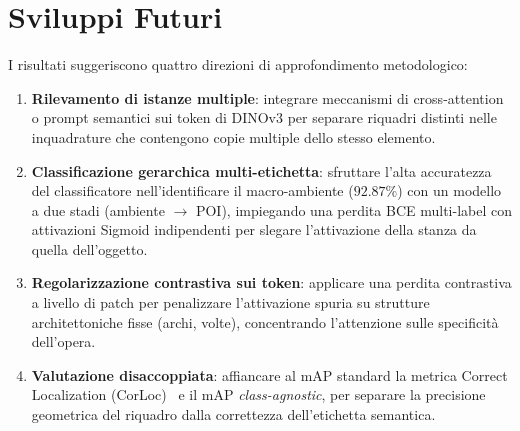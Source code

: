 \section{Sviluppi Futuri}
\label{sec:conc_sviluppi}
I risultati suggeriscono quattro direzioni di approfondimento metodologico:
\begin{enumerate}\setlength{\itemsep}{1pt}\setlength{\parskip}{0pt}
    \item \textbf{Rilevamento di istanze multiple}: integrare meccanismi di cross-attention o prompt semantici sui token di DINOv3 per separare riquadri distinti nelle inquadrature che contengono copie multiple dello stesso elemento.
    \item \textbf{Classificazione gerarchica multi-etichetta}: sfruttare l'alta accuratezza del classificatore nell'identificare il macro-ambiente ($92.87\%$) con un modello a due stadi (ambiente $\to$ POI), impiegando una perdita BCE multi-label con attivazioni Sigmoid indipendenti per slegare l'attivazione della stanza da quella dell'oggetto.
    \item \textbf{Regolarizzazione contrastiva sui token}: applicare una perdita contrastiva a livello di patch per penalizzare l'attivazione spuria su strutture architettoniche fisse (archi, volte), concentrando l'attenzione sulle specificità dell'opera.
    \item \textbf{Valutazione disaccoppiata}: affiancare al mAP standard la metrica Correct Localization (CorLoc)~\cite{choe2020evaluating} e il mAP \textit{class-agnostic}, per separare la precisione geometrica del riquadro dalla correttezza dell'etichetta semantica.
\end{enumerate}
